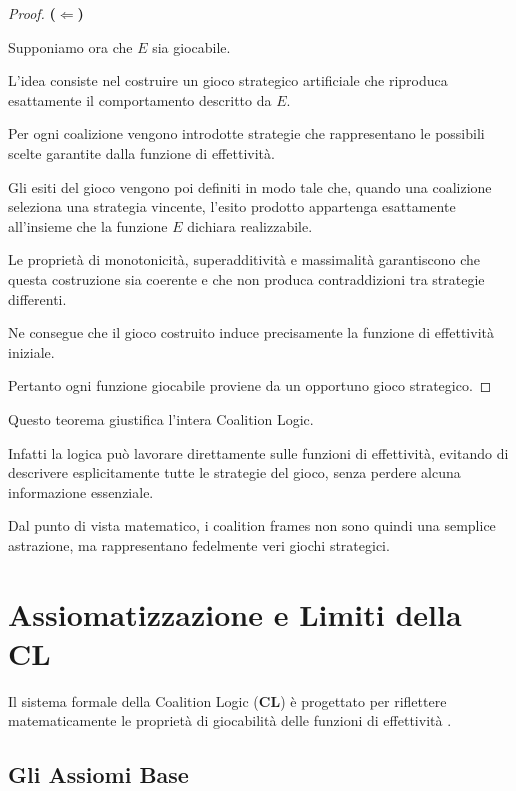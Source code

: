 \documentclass[12pt]{article}
\begin{document}
\begin{proof}
	\textbf{($\Leftarrow$)}

	Supponiamo ora che $E$ sia giocabile.

	L'idea consiste nel costruire un gioco strategico artificiale che
	riproduca esattamente il comportamento descritto da $E$.

	Per ogni coalizione vengono introdotte strategie che rappresentano
	le possibili scelte garantite dalla funzione di effettività.

	Gli esiti del gioco vengono poi definiti in modo tale che,
	quando una coalizione seleziona una strategia vincente,
	l'esito prodotto appartenga esattamente all'insieme che la funzione
	$E$ dichiara realizzabile.

	Le proprietà di monotonicità, superadditività e massimalità
	garantiscono che questa costruzione sia coerente e che non produca
	contraddizioni tra strategie differenti.

	Ne consegue che il gioco costruito induce precisamente la funzione
	di effettività iniziale.

	Pertanto ogni funzione giocabile proviene da un opportuno gioco
	strategico.

\end{proof}

Questo teorema giustifica l'intera Coalition Logic.

Infatti la logica può lavorare direttamente sulle funzioni di
effettività, evitando di descrivere esplicitamente tutte le strategie
del gioco, senza perdere alcuna informazione essenziale.

Dal punto di vista matematico, i coalition frames non sono quindi una
semplice astrazione, ma rappresentano fedelmente veri giochi
strategici.
\section{Assiomatizzazione e Limiti della CL}

Il sistema formale della Coalition Logic ($\mathbf{CL}$) è progettato per
riflettere matematicamente le proprietà di giocabilità delle funzioni di
effettività .

\subsection{Gli Assiomi Base}
\end{document}
